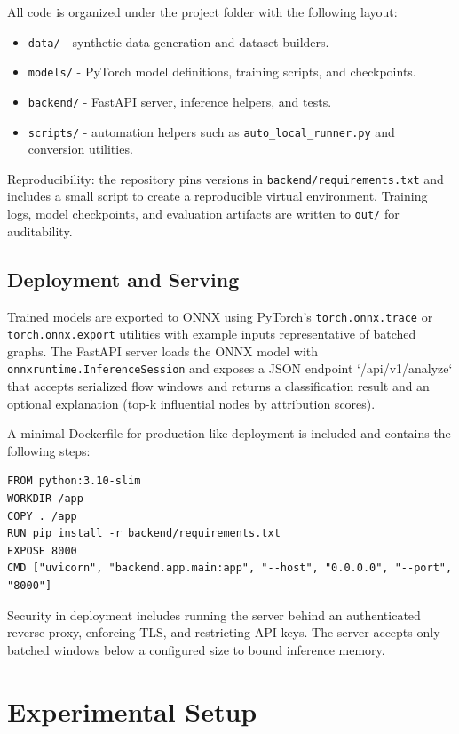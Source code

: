 \documentclass[conference]{IEEEtran}
\begin{document}
All code is organized under the project folder with the following layout:

\begin{itemize}
	\item \texttt{data/} - synthetic data generation and dataset builders.
	\item \texttt{models/} - PyTorch model definitions, training scripts, and checkpoints.
	\item \texttt{backend/} - FastAPI server, inference helpers, and tests.
	\item \texttt{scripts/} - automation helpers such as \texttt{auto\_local\_runner.py} and conversion utilities.
\end{itemize}

Reproducibility: the repository pins versions in \texttt{backend/requirements.txt} and includes a small script to create a reproducible virtual environment. Training logs, model checkpoints, and evaluation artifacts are written to \texttt{out/} for auditability.

\subsection{Deployment and Serving}

Trained models are exported to ONNX using PyTorch's \texttt{torch.onnx.trace} or \texttt{torch.onnx.export} utilities with example inputs representative of batched graphs. The FastAPI server loads the ONNX model with \texttt{onnxruntime.InferenceSession} and exposes a JSON endpoint `/api/v1/analyze` that accepts serialized flow windows and returns a classification result and an optional explanation (top-k influential nodes by attribution scores).

A minimal Dockerfile for production-like deployment is included and contains the following steps:

\begin{verbatim}
FROM python:3.10-slim
WORKDIR /app
COPY . /app
RUN pip install -r backend/requirements.txt
EXPOSE 8000
CMD ["uvicorn", "backend.app.main:app", "--host", "0.0.0.0", "--port", "8000"]
\end{verbatim}

Security in deployment includes running the server behind an authenticated reverse proxy, enforcing TLS, and restricting API keys. The server accepts only batched windows below a configured size to bound inference memory.

\section{Experimental Setup}
\end{document}
